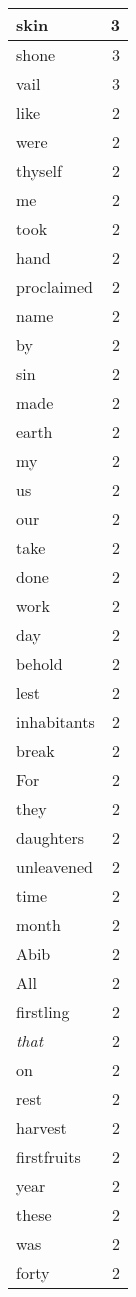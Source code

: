\begin{center}
\begin{longtable}{l|r}
skin & 3 \\ \hline
shone & 3 \\ \hline
vail & 3 \\ \hline
like & 2 \\ \hline
were & 2 \\ \hline
thyself & 2 \\ \hline
me & 2 \\ \hline
took & 2 \\ \hline
hand & 2 \\ \hline
proclaimed & 2 \\ \hline
name & 2 \\ \hline
by & 2 \\ \hline
sin & 2 \\ \hline
made & 2 \\ \hline
earth & 2 \\ \hline
my & 2 \\ \hline
us & 2 \\ \hline
our & 2 \\ \hline
take & 2 \\ \hline
done & 2 \\ \hline
work & 2 \\ \hline
day & 2 \\ \hline
behold & 2 \\ \hline
lest & 2 \\ \hline
inhabitants & 2 \\ \hline
break & 2 \\ \hline
For & 2 \\ \hline
they & 2 \\ \hline
daughters & 2 \\ \hline
unleavened & 2 \\ \hline
time & 2 \\ \hline
month & 2 \\ \hline
Abib & 2 \\ \hline
All & 2 \\ \hline
firstling & 2 \\ \hline
\emph{that} & 2 \\ \hline
on & 2 \\ \hline
rest & 2 \\ \hline
harvest & 2 \\ \hline
firstfruits & 2 \\ \hline
year & 2 \\ \hline
these & 2 \\ \hline
was & 2 \\ \hline
forty & 2 \\ \hline

\end{longtable}
\end{center}
